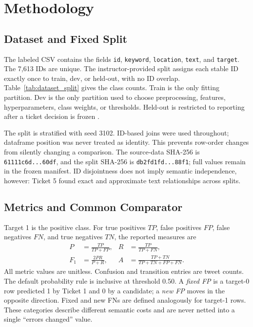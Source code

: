\documentclass[conference]{IEEEtran}
\begin{document}
\section{Methodology}

\subsection{Dataset and Fixed Split}

The labeled CSV contains the fields \texttt{id}, \texttt{keyword}, \texttt{location}, \texttt{text}, and \texttt{target}. The 7,613 IDs are unique. The instructor-provided split assigns each stable ID exactly once to train, dev, or held-out, with no ID overlap. Table~\ref{tab:dataset_split} gives the class counts. Train is the only fitting partition. Dev is the only partition used to choose preprocessing, features, hyperparameters, class weights, or thresholds. Held-out is restricted to reporting after a ticket decision is frozen \cite{starter-readme,starter-data}.



The split is stratified with seed 3102. ID-based joins were used throughout; dataframe position was never treated as identity. This prevents row-order changes from silently changing a comparison. The source-data SHA-256 is \texttt{61111c6d...60df}, and the split SHA-256 is \texttt{db2fd1fd...88f1}; full values remain in the frozen manifest. ID disjointness does not imply semantic independence, however: Ticket 5 found exact and approximate text relationships across splits.

\subsection{Metrics and Common Comparator}

Target 1 is the positive class. For true positives $TP$, false positives $FP$, false negatives $FN$, and true negatives $TN$, the reported measures are
\begin{align}
P &= \frac{TP}{TP+FP}, &
R &= \frac{TP}{TP+FN},\\
F_1 &= \frac{2PR}{P+R}, &
A &= \frac{TP+TN}{TP+TN+FP+FN}.
\end{align}
All metric values are unitless. Confusion and transition entries are tweet counts. The default probability rule is inclusive at threshold 0.50. A \emph{fixed FP} is a target-0 row predicted 1 by Ticket 1 and 0 by a candidate; a \emph{new FP} moves in the opposite direction. Fixed and new FNs are defined analogously for target-1 rows. These categories describe different semantic costs and are never netted into a single ``errors changed'' value.
\end{document}
